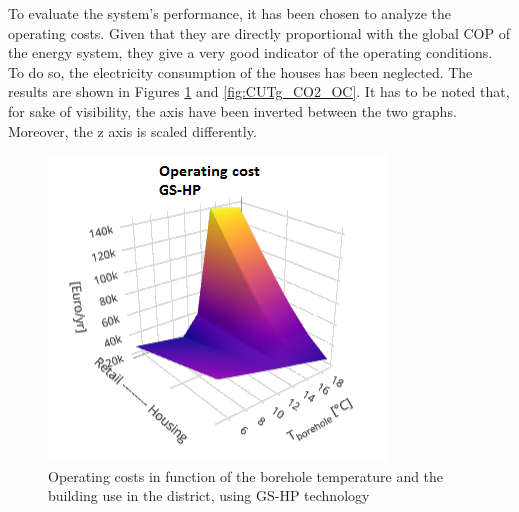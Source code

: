 \documentclass{article}
\begin{document}

To evaluate the system's performance, it has been chosen to analyze the operating costs. Given that they are directly proportional with the global COP of the energy system, they give a very good indicator of the operating conditions. To do so, the electricity consumption of the houses has been neglected. The results are shown in Figures \ref{fig:CUTg_OC} and \ref{fig:CUTg_CO2_OC}. It has to be noted that, for sake of visibility, the axis have been inverted between the two graphs. Moreover, the z axis is scaled differently.\\

\begin{figure}[htp]
	\centering
	\includegraphics[width=\textwidth]{CUTg_SA_OC.png}
	\caption{Operating costs in function of the borehole temperature and the building use in the district, using GS-HP technology}
	\label{fig:CUTg_OC}
\end{figure}
\end{document}

